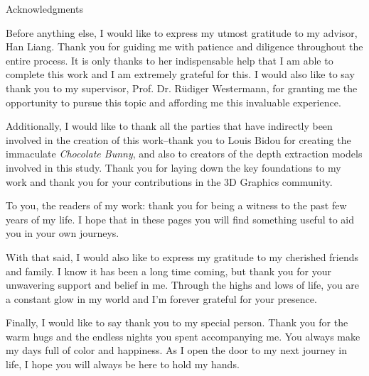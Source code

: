 \thispagestyle{empty}

\vspace*{20mm}

\begin{center}
{ Acknowledgments}
\end{center}

\vspace{10mm}

Before anything else, I would like to express my utmost gratitude to my advisor, Han Liang. Thank you for guiding me with patience and diligence throughout the entire process. It is only thanks to her indispensable help that I am able to complete this work and I am extremely grateful for this. I would also like to say thank you to my supervisor, Prof. Dr. Rüdiger Westermann, for granting me the opportunity to pursue this topic and affording me this invaluable experience.

Additionally, I would like to thank all the parties that have indirectly been involved in the creation of this work--thank you to Louis Bidou for creating the immaculate \textit{Chocolate Bunny}, and also to creators of the depth extraction models involved in this study. Thank you for laying down the key foundations to my work and thank you for your contributions in the 3D Graphics community.

To you, the readers of my work: thank you for being a witness to the past few years of my life. I hope that in these pages you will find something useful to aid you in your own journeys.

With that said, I would also like to express my gratitude to my cherished friends and family. I know it has been a long time coming, but thank you for your unwavering support and belief in me. Through the highs and lows of life, you are a constant glow in my world and I'm forever grateful for your presence.

Finally, I would like to say thank you to my special person. Thank you for the warm hugs and the endless nights you spent accompanying me. You always make my days full of color and happiness. As I open the door to my next journey in life, I hope you will always be here to hold my hands.

\cleardoublepage{}
